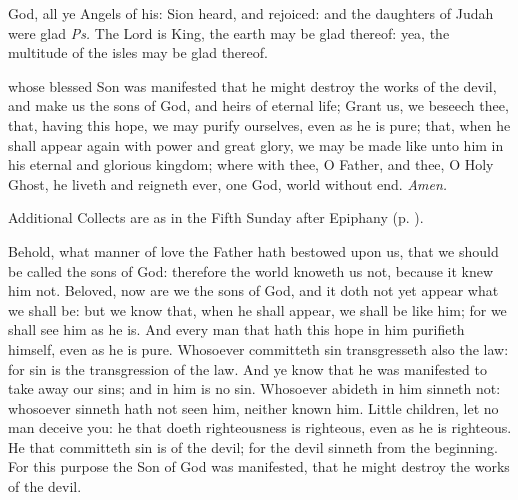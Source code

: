 

\properantiphonfix

\introit
{} God, all ye Angels of his: Sion heard, and rejoiced: and the daughters of Judah were glad \textit{Ps.} The Lord is King, the earth may be glad thereof: yea, the multitude of the isles may be glad thereof.

\collect
{} whose blessed Son was manifested that he might destroy the works of the devil, and make us the sons of God, and heirs of eternal life; Grant us, we beseech thee, that, having this hope, we may purify ourselves, even as he is pure; that, when he shall appear again with power and great glory, we may be made like unto him in his eternal and glorious kingdom; where with thee, O Father, and thee, O Holy Ghost, he liveth and reigneth ever, one God, world without end. \textit{Amen.}
\begin{rubric}
    Additional Collects are as in the Fifth Sunday after Epiphany (p. \pageref{EpiphanyVCollect}).
\end{rubric}

 Behold, what manner of love the Father hath bestowed upon us, that we should be called the sons of God: therefore the world knoweth us not, because it knew him not. Beloved, now are we the sons of God, and it doth not yet appear what we shall be: but we know that, when he shall appear, we shall be like him; for we shall see him as he is. And every man that hath this hope in him purifieth himself, even as he is pure. Whosoever committeth sin transgresseth also the law: for sin is the transgression of the law. And ye know that he was manifested to take away our sins; and in him is no sin. Whosoever abideth in him sinneth not: whosoever sinneth hath not seen him, neither known him. Little children, let no man deceive you: he that doeth righteousness is righteous, even as he is righteous. He that committeth sin is of the devil; for the devil sinneth from the beginning. For this purpose the Son of God was manifested, that he might destroy the works of the devil.


